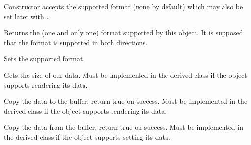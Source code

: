 
\label{wxdataobjectsimplewxdataobjectsimple}


Constructor accepts the supported format (none by default) which may also be
set later with .

\label{wxdataobjectsimplegetformat}


Returns the (one and only one) format supported by this object. It is supposed
that the format is supported in both directions.

\label{wxdataobjectsimplesetformat}


Sets the supported format.

\label{wxdataobjectsimplegetdatasize}


Gets the size of our data. Must be implemented in the derived class if the
object supports rendering its data.

\label{wxdataobjectsimplegetdatahere}


Copy the data to the buffer, return true on success. Must be implemented in the
derived class if the object supports rendering its data.


\label{wxdataobjectsimplesetdata}


Copy the data from the buffer, return true on success. Must be implemented in
the derived class if the object supports setting its data.


